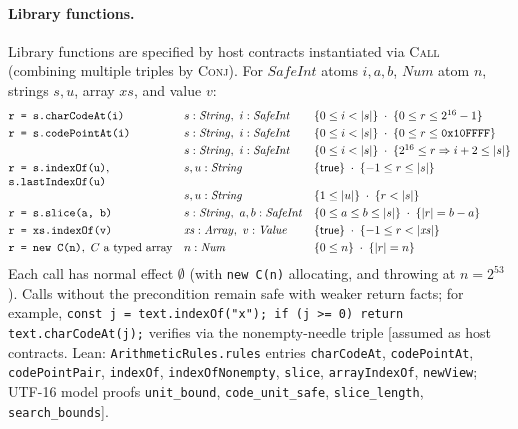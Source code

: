 \documentclass[10pt,a4paper]{article}
\theoremstyle{definition}
\theoremstyle{remark}
\newcommand{\kw}[1]{\mathsf{#1}}
\newcommand{\len}[1]{|#1|}
\newcommand{\hoare}[3]{\{#1\}\;#2\;\{#3\}}
\newcommand{\code}[1]{\texttt{#1}}
\newcommand{\lean}[1]{\texttt{\small #1}}
\newcommand{\status}[1]{\textsf{\small[#1]}}
\begin{document}
\paragraph{Library functions.}
Library functions are specified by host contracts instantiated via
\textsc{Call} (combining multiple triples by \textsc{Conj}). For
$\mathit{SafeInt}$ atoms $i,a,b$, $\mathit{Num}$ atom $n$, strings $s,u$,
array $\mathit{xs}$, and value $v$:
{\small\begin{displaymath}
\begin{array}{@{}lll@{}}
\code{r = s.charCodeAt(i)} & s:\mathit{String},\ i:\mathit{SafeInt} & \hoare{0\le i<\len s}{\cdot}{0\le r\le 2^{16}-1}\\[3pt]
\code{r = s.codePointAt(i)} & s:\mathit{String},\ i:\mathit{SafeInt} & \hoare{0\le i<\len s}{\cdot}{0\le r\le \code{0x10FFFF}}\\[3pt]
 & s:\mathit{String},\ i:\mathit{SafeInt} & \hoare{0\le i<\len s}{\cdot}{2^{16}\le r\Rightarrow i+2\le \len s}\\[3pt]
\begin{array}[t]{@{}l@{}}\code{r = s.indexOf(u)},\\ \code{s.lastIndexOf(u)}\end{array} & s,u:\mathit{String} & \hoare{\kw{true}}{\cdot}{-1\le r\le \len s}\\[3pt]
 & s,u:\mathit{String} & \hoare{1\le \len u}{\cdot}{r<\len s}\\[3pt]
\code{r = s.slice(a, b)} & s:\mathit{String},\ a,b:\mathit{SafeInt} & \hoare{0\le a\le b\le \len s}{\cdot}{\len r=b-a}\\[3pt]
\code{r = xs.indexOf(v)} & \mathit{xs}:\mathit{Array},\ v:\mathit{Value} & \hoare{\kw{true}}{\cdot}{-1\le r<\len{\mathit{xs}}}\\[3pt]
\code{r = new C(n)},\ C\text{ a typed array} & n:\mathit{Num} & \hoare{0\le n}{\cdot}{\len r=n}
\end{array}
\end{displaymath}}
Each call has normal effect $\emptyset$ (with \code{new C(n)} allocating,
and throwing at $n=2^{53}$). Calls without the precondition remain safe
with weaker return facts; for example,
\code{const j = text.indexOf("x"); if (j >= 0) return text.charCodeAt(j);}
verifies via the nonempty-needle triple
\status{assumed as host contracts. Lean: \lean{ArithmeticRules.rules} entries \lean{charCodeAt}, \lean{codePointAt}, \lean{codePointPair}, \lean{indexOf}, \lean{indexOfNonempty}, \lean{slice}, \lean{arrayIndexOf}, \lean{newView}; UTF-16 model proofs \lean{unit\_bound}, \lean{code\_unit\_safe}, \lean{slice\_length}, \lean{search\_bounds}}.
\end{document}
